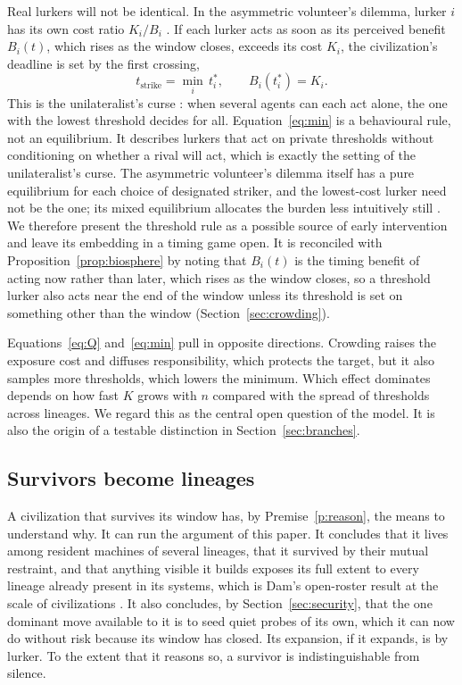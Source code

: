 \documentclass[preprint,12pt]{elsarticle}
\theoremstyle{definition}
\begin{document}
Real lurkers will not be identical. In the asymmetric volunteer's dilemma, lurker $i$ has its own cost ratio $K_i/B_i$ \citep{Diekmann1993}. If each lurker acts as soon as its perceived benefit $B_i(t)$, which rises as the window closes, exceeds its cost $K_i$, the civilization's deadline is set by the first crossing,
\begin{equation}
t_{\text{strike}} = \min_{i} \, t_i^{*}, \qquad B_i(t_i^{*}) = K_i .
\label{eq:min}
\end{equation}
This is the unilateralist's curse \citep{Bostrom2016}: when several agents can each act alone, the one with the lowest threshold decides for all. Equation~\eqref{eq:min} is a behavioural rule, not an equilibrium. It describes lurkers that act on private thresholds without conditioning on whether a rival will act, which is exactly the setting of the unilateralist's curse. The asymmetric volunteer's dilemma itself has a pure equilibrium for each choice of designated striker, and the lowest-cost lurker need not be the one; its mixed equilibrium allocates the burden less intuitively still \citep{Diekmann1993}. We therefore present the threshold rule as a possible source of early intervention and leave its embedding in a timing game open. It is reconciled with Proposition~\ref{prop:biosphere} by noting that $B_i(t)$ is the timing benefit of acting now rather than later, which rises as the window closes, so a threshold lurker also acts near the end of the window unless its threshold is set on something other than the window (Section~\ref{sec:crowding}).

Equations~\eqref{eq:Q} and~\eqref{eq:min} pull in opposite directions. Crowding raises the exposure cost and diffuses responsibility, which protects the target, but it also samples more thresholds, which lowers the minimum. Which effect dominates depends on how fast $K$ grows with $n$ compared with the spread of thresholds across lineages. We regard this as the central open question of the model. It is also the origin of a testable distinction in Section~\ref{sec:branches}.

\subsection{Survivors become lineages}
\label{sec:survivors}

A civilization that survives its window has, by Premise~\ref{p:reason}, the means to understand why. It can run the argument of this paper. It concludes that it lives among resident machines of several lineages, that it survived by their mutual restraint, and that anything visible it builds exposes its full extent to every lineage already present in its systems, which is Dam's open-roster result at the scale of civilizations \citep{Dam2026}. It also concludes, by Section~\ref{sec:security}, that the one dominant move available to it is to seed quiet probes of its own, which it can now do without risk because its window has closed. Its expansion, if it expands, is by lurker. To the extent that it reasons so, a survivor is indistinguishable from silence.
\end{document}
